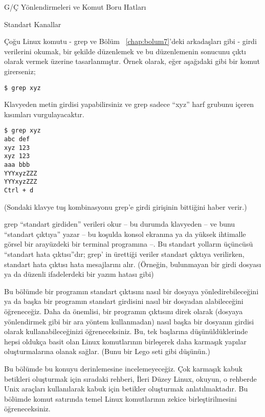 \begin{section}{G/Ç Yönlendirmeleri ve Komut Boru Hatları}
\begin{subsection}{Standart Kanallar}

Çoğu Linux komutu - grep ve Bölüm ~\ref{chap:bolum7}'deki arkadaşları gibi - girdi verilerini okumak, bir şekilde düzenlemek ve bu düzenlemenin sonucunu çıktı olarak vermek üzerine tasarlanmıştır. Örnek olarak, eğer aşağıdaki gibi bir komut girerseniz;

\begin{verbatim}
$ grep xyz
\end{verbatim}

Klavyeden metin girdisi yapabilirsiniz ve grep sadece “xyz” harf grubunu içeren kısımları vurgulayacaktır.

\begin{verbatim}
$ grep xyz
abc def
xyz 123
xyz 123
aaa bbb
YYYxyzZZZ
YYYxyzZZZ
Ctrl + d
\end{verbatim}

(Sondaki klavye tuş kombinasyonu grep'e girdi girişinin bittiğini haber verir.)

grep “standart girdiden” verileri okur – bu durumda klavyeden – ve bunu “standart çıktıya” yazar – bu koşulda konsol ekranına ya da yüksek ihtimalle görsel bir arayüzdeki bir terminal programına –. Bu standart yolların üçüncüsü “standart hata çıktısı”dır; grep' in ürettiği veriler standart çıktıya verilirken, standart hata çıktısı hata mesajlarını alır. (Örneğin, bulunmayan bir girdi dosyası ya da düzenli ifadelerdeki bir yazım hatası gibi)

Bu bölümde bir programın standart çıktısını nasıl bir dosyaya yönledirebileceğini ya da başka bir programın standart girdisini nasıl bir dosyadan alabileceğini öğreneceğiz. Daha da önemlisi, bir programın çıktısını direk olarak (dosyaya yönlendirmek gibi bir ara yöntem kullanmadan) nasıl başka bir dosyanın girdisi olarak kullanabileceğinizi öğreneceksiniz.  Bu, tek başlarına düşünüldüklerinde hepsi oldukça basit olan Linux komutlarının birleşerek daha karmaşık yapılar oluşturmalarına olanak sağlar. (Bunu bir Lego seti gibi düşünün.)

Bu bölümde bu konuyu derinlemesine incelemeyeceğiz. Çok karmaşık kabuk betikleri oluşturmak için sıradaki rehberi, İleri Düzey Linux, okuyun, o rehberde Unix araçları kullanılarak kabuk için betikler oluşturmak anlatılmaktadır. Bu bölümde komut satırında temel Linux komutlarının zekice birleştirilmesini öğreneceksiniz. 


\end{subsection}
\end{section}

